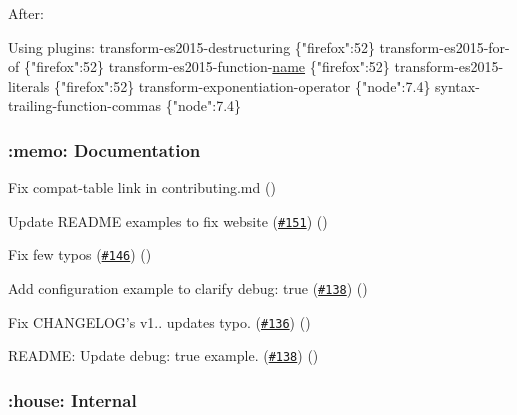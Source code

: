 After\+:


\begin{DoxyCode}
Using plugins:
  transform-es2015-destructuring \{\textcolor{stringliteral}{"firefox"}:52\}
  transform-es2015-\textcolor{keywordflow}{for}-of \{\textcolor{stringliteral}{"firefox"}:52\}
  transform-es2015-\textcolor{keyword}{function}-\mbox{\hyperlink{namespacesetup_ab3a7a0638d76a01367c5bc3cc699447f}{name}} \{\textcolor{stringliteral}{"firefox"}:52\}
  transform-es2015-literals \{\textcolor{stringliteral}{"firefox"}:52\}
  transform-exponentiation-\textcolor{keyword}{operator} \{\textcolor{stringliteral}{"node"}:7.4\}
  syntax-trailing-\textcolor{keyword}{function}-commas \{\textcolor{stringliteral}{"node"}:7.4\}
\end{DoxyCode}


\subsubsection*{\+:memo\+: Documentation}


\begin{DoxyItemize}
\item Fix compat-\/table link in contributing.\+md ()
\item Update R\+E\+A\+D\+ME examples to fix website (\href{https://github.com/babel/babel-preset-env/pull/}{\tt \#151}) ()
\item Fix few typos (\href{https://github.com/babel/babel-preset-env/pull/146}{\tt \#146}) ()
\item Add configuration example to clarify {\ttfamily debug\+: true} (\href{https://github.com/babel/babel-preset-env/pull/138}{\tt \#138}) ()
\item Fix C\+H\+A\+N\+G\+E\+L\+O\+G’s v1.. updates typo. (\href{https://github.com/babel/babel-preset-env/pull/136}{\tt \#136}) ()
\item R\+E\+A\+D\+ME\+: Update {\ttfamily debug\+: true} example. (\href{https://github.com/babel/babel-preset-env/pull/138}{\tt \#138}) ()
\end{DoxyItemize}

\subsubsection*{\+:house\+: Internal}


